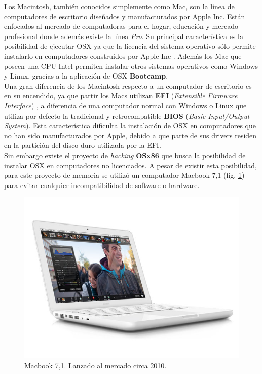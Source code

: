 		Los Macintosh, también conocidos simplemente como Mac, son la línea de computadores de escritorio diseñados y manufacturados por Apple Inc. Están enfocados al mercado de computadoras para el hogar, educación y mercado profesional donde además existe la línea \textit{Pro}. Su principal característica es la posibilidad de ejecutar OSX ya que la licencia del sistema operativo sólo permite instalarlo en computadores construidos por Apple Inc \cite{web:license-osx}. Además los Mac que poseen una CPU Intel permiten instalar otros sistemas operativos como Windows y Linux, gracias a la aplicación de OSX \textbf{Bootcamp}.\\
		
		 Una gran diferencia de los Macintosh respecto a un computador de escritorio es en su encendido, ya que partir los Macs utilizan \textbf{EFI} (\textit{Extensible Firmware Interface}) , a diferencia de una computador normal con Windows o Linux que utiliza por defecto la tradicional y retrocompatible \textbf{BIOS} (\textit{Basic Input/Output System}). Esta característica dificulta la instalación de OSX en computadores que no han sido manufacturados por Apple, debido a que parte de sus drivers residen en la partición del disco duro utilizada por la EFI.\\
		 
		 Sin embargo existe el proyecto de \textit{hacking} \textbf{OSx86} \cite{web:osx86} que busca la posibilidad de instalar OSX  en computadores no licenciados. A pesar de existir esta posibilidad, para este proyecto de memoria se utilizó un computador Macbook 7,1 (fig. \ref{img:macbook71}) para evitar cualquier incompatibilidad de software o hardware.
		 
\begin{figure}[H]
	\centering
	\includegraphics[scale=0.35]{imgs/macbook71.png} 
	\caption{Macbook 7,1. Lanzado al mercado circa 2010.}
	\label{img:macbook71}
\end{figure} 	 
		 
